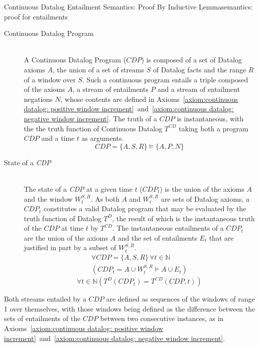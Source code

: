 \begin{nestedsection}{Continuous Datalog Entailment Semantics: Proof By Inductive Lemma}{semantics: proof for entailments}
\begin{enumerate}
		\setcounter{continuousDatalogAxioms}{\theenumi}
	\end{enumerate}
	\begin{description}
		\item[Continuous Datalog Program]\label{def:continuous datalog: CDP}\hfill\\
			A Continuous Datalog Program (${CDP}$) is composed of a set of Datalog axioms $A$, the union of a set of streams $S$ of Datalog facts and the range $R$ of a window over $S$.
			Such a continuous program entails a triple composed of the axioms $A$, a stream of entailments $P$ and a stream of entailment negations $N$, whose contents are defined in Axioms~\ref{axiom:continuous datalog: positive window increment}~and~\ref{axiom:continuous datalog: negative window increment}.
			The truth of a ${CDP}$ is instantaneous, with the the truth function of Continuous Datalog $T^{CD}$ taking both a program $CDP$ and a time $t$ as arguments.
			\begin{equation*}
				CDP = \{A,S,R\} \vDash \{A,P,N\}
			\end{equation*}
		\item[State of a \emph{CDP}]\label{def:continuous datalog: CDPt}\hfill\\
			The state of a \emph{CDP} at a given time $t$ (${CDP_t}$) is the union of the axioms $A$ and the window $W^{S,R}_{t}$.
			As both $A$ and $W^{S,R}_{t}$ are sets of Datalog axioms, a ${CDP_t}$ constitutes a valid Datalog program that may be evaluated by the truth function of Datalog $T^{D}$, the result of which is the instantaneous truth of the ${CDP}$ at time $t$ by $T^{CD}$.
			The instantaneous entailments of a $CDP_{t}$ are the union of the axioms $A$ and the set of entailments $E_{t}$ that are justified in part by a subset of $W^{S,R}_{t}$.
			\begin{multline*}
				\forall CDP = \{A,S,R\} \, \forall t \in \mathbb{N} \\
					\left( CDP_t = A \cup W^{S,R}_t \vDash A \cup E_t \right)
			\end{multline*}
			\begin{equation*}
				\forall t \in \mathbb{N} \left( T^{D} \left( CDP_t \right) = T^{CD} \left( CDP, t \right) \right)
			\end{equation*}
	\end{description}
	Both streams entailed by a ${CDP}$ are defined as sequences of the windows of range 1 over themselves, with those windows being defined as the difference between the sets of entailments of the ${CDP}$ between two consecutive instances, as in Axioms~\ref{axiom:continuous datalog: positive window increment}~and~\ref{axiom:continuous datalog: negative window increment}.

\end{nestedsection}
